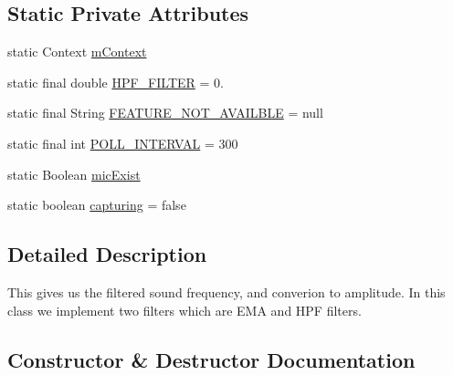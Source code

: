 \subsection*{Static Private Attributes}
\begin{DoxyCompactItemize}
\item 
static Context \hyperlink{classcs_1_1usense_1_1microphone_1_1_sound_manager_a5a69cb1ee55ad355470977fd94a9b190}{m\+Context}
\item 
static final double \hyperlink{classcs_1_1usense_1_1microphone_1_1_sound_manager_ace3edd2393c86123473d78860e48ee6a}{H\+P\+F\+\_\+\+F\+I\+L\+T\+E\+R} = 0.
\item 
static final String \hyperlink{classcs_1_1usense_1_1microphone_1_1_sound_manager_ab8c335dc6f2b49d508849e61a044b60c}{F\+E\+A\+T\+U\+R\+E\+\_\+\+N\+O\+T\+\_\+\+A\+V\+A\+I\+L\+B\+L\+E} = null
\item 
static final int \hyperlink{classcs_1_1usense_1_1microphone_1_1_sound_manager_a402c544cc461ed5f455b1ae97fd6cbbc}{P\+O\+L\+L\+\_\+\+I\+N\+T\+E\+R\+V\+A\+L} = 300
\item 
static Boolean \hyperlink{classcs_1_1usense_1_1microphone_1_1_sound_manager_ae449a315ff7fb69c5b46ed55145d4e35}{mic\+Exist}
\item 
static boolean \hyperlink{classcs_1_1usense_1_1microphone_1_1_sound_manager_ac33ab3ce4cf4d4c09406fb509ab30bcc}{capturing} = false
\end{DoxyCompactItemize}


\subsection{Detailed Description}
This gives us the filtered sound frequency, and converion to amplitude. In this class we implement two filters which are E\+M\+A and H\+P\+F filters. 

\subsection{Constructor \& Destructor Documentation}
\hypertarget{classcs_1_1usense_1_1microphone_1_1_sound_manager_a19056164df8fe6de6f14e92e55de2b8a}{}
